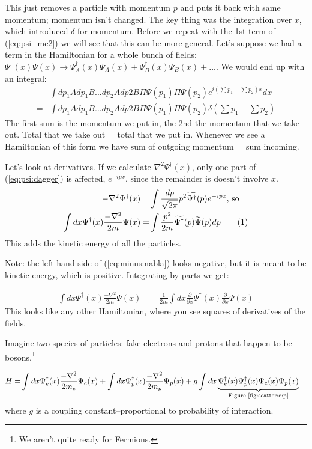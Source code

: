 \documentclass[]{article}
\newcommand\numberthis{\addtocounter{equation}{1}\tag{\theequation}}
\begin{document}
This just removes a particle with momentum $p$ and puts it back with same momentum; momentum isn't changed. The key thing was the integration over $x$, which introduced $\delta$ for momentum. Before we repeat with the 1st term of (\ref{eq:psi_mc2}) we will see that this can be more general. Let's suppose we had a term in the Hamiltonian for a whole bunch of fields: $\Psi^\dagger(x) \Psi(x)\rightarrow \Psi^\dagger_A(x) \Psi_A(x) + \Psi^\dagger_B(x) \Psi_B(x)+...$. We would end up with an integral:
\begin{align*}
	&\int dp_1A dp_1B...dp_2A dp 2B \Pi \Psi(p_1) \Pi \Psi(p_2) e^{i(\sum p_1-\sum p_2)x} dx\\
	=&\int dp_1A dp_1B...dp_2A dp 2B \Pi \Psi(p_1) \Pi \Psi(p_2) \delta(\sum p_1-\sum p_2) 
\end{align*}
The first sum is the momentum we put in, the 2nd the momentum that we take out. Total that we take out = total that we put in. Whenever we see a Hamiltonian of this form we have sum of outgoing momentum = sum incoming.

Let's look at derivatives. If we calculate $\nabla^2 \Psi^\dagger (x)$,  only one part of (\ref{eq:psi:dagger}) is affected, $e^{-ipx}$, since the remainder is doesn't involve $x$. 
\begin{align*}
	- \nabla^2 \Psi^\dagger (x) =& \int \frac{dp}{\sqrt{2\pi}} p^2 \widetilde{\Psi^\dagger}(p) e^{-ipx}\text{, so}\\
	\int dx \Psi^\dagger(x) \frac{- \nabla^2}{2m} \Psi(x)=& \int \frac{ p^2}{2m} \widetilde{\Psi^\dagger}(p) \widetilde{\Psi}(p) dp \numberthis \label{eq:minus:nabla}
\end{align*}
This adds the kinetic energy of all the particles.

Note: the left hand side of (\ref{eq:minus:nabla}) looks negative, but it is meant to be kinetic energy, which is positive. Integrating by parts we get:

\begin{align*}
	\int dx \Psi^\dagger(x) \frac{- \nabla^2}{2m} \Psi(x)=& \frac{1}{2m} \int dx \frac{\partial }{\partial x} \Psi^\dagger(x)  \frac{\partial }{\partial x} \Psi(x)
\end{align*}
This looks like any other Hamiltonian, where you see squares of derivatives of the fields. 

Imagine two species of particles: fake electrons and protons that happen to be bosons.\footnote{We aren't quite ready for Fermions.}

\begin{align*}
	H =& \int dx  \Psi^\dagger_e(x) \frac{- \nabla^2}{2m_e} \Psi_e(x) + \int dx \Psi^\dagger_p(x) \frac{- \nabla^2}{2m_p} \Psi_p(x)  + g \int dx \underbrace{\Psi^\dagger_e(x) \Psi^\dagger_p(x) \Psi_e(x) \Psi_p(x)}_\text{Figure \ref{fig:scatter:e:p}} 
\end{align*}
where $g$ is a coupling constant--proportional to probability of interaction. 
\end{document}
